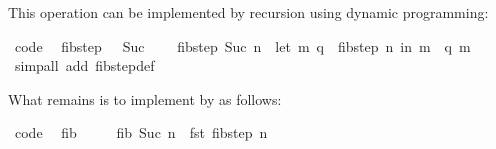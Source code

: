 \begin{isabellebody}
\endisatagquote
{\isafoldquote}%
%
\isadelimquote
%
\endisadelimquote
%
\begin{isamarkuptext}%
\noindent This operation can be implemented by recursion using
  dynamic programming:%
\end{isamarkuptext}%
\isamarkuptrue%
%
\isadelimquote
%
\endisadelimquote
%
\isatagquote
{}\isamarkupfalse%
\ {}code{}{}\isanewline
\ \ {}fib{}step\ {}\ {}\ {}Suc\ {}{}\ {}{}{}\isanewline
\ \ {}fib{}step\ {}Suc\ n{}\ {}\ {}let\ {}m{}\ q{}\ {}\ fib{}step\ n\ in\ {}m\ {}\ q{}\ m{}{}{}\isanewline
\ \ \isamarkupfalse%
\ {}simp{}all\ add{}\ fib{}step{}def{}%
\endisatagquote
{\isafoldquote}%
%
\isadelimquote
%
\endisadelimquote
%
\begin{isamarkuptext}%
\noindent What remains is to implement  by  as follows:%
\end{isamarkuptext}%
\isamarkuptrue%
%
\isadelimquote
%
\endisadelimquote
%
\isatagquote
{}\isamarkupfalse%
\ {}code{}{}\isanewline
\ \ {}fib\ {}\ {}\ {}{}\isanewline
\ \ {}fib\ {}Suc\ n{}\ {}\ fst\ {}fib{}step\ n{}{}\isanewline

\end{isabellebody}
